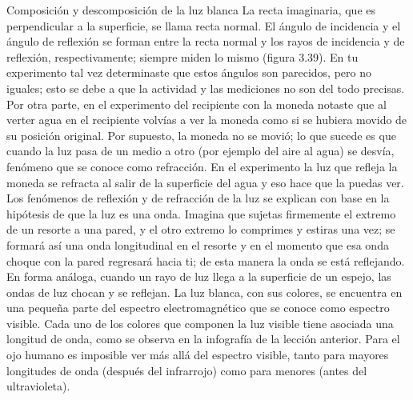 \begin{sectionbox}{Composición y descomposición de la luz blanca}
           La recta imaginaria, que es perpendicular a la superficie, se llama recta normal. El
           ángulo de incidencia y el ángulo de reflexión se forman entre la recta normal y los rayos de incidencia y de reflexión, respectivamente; siempre miden lo mismo (figura 3.39).
           En tu experimento tal vez determinaste que estos ángulos son parecidos, pero no iguales; esto se debe a que la actividad y las mediciones no son del todo precisas.
           Por otra parte, en el experimento del recipiente con la moneda notaste que al verter
           agua en el recipiente volvías a ver la moneda como si se hubiera movido de su posición
           original. Por supuesto, la moneda no se movió; lo que sucede es que cuando la luz pasa
           de un medio a otro (por ejemplo del aire al agua) se desvía, fenómeno que se conoce como
           refracción. En el experimento la luz que refleja la moneda se refracta
           al salir de la superficie del agua y eso hace que la puedas ver.
           Los fenómenos de reflexión y de refracción de la luz se explican
           con base en la hipótesis de que la luz es una onda. Imagina que
           sujetas firmemente el extremo de un resorte a una pared, y el otro
           extremo lo comprimes y estiras una vez; se formará así una onda
           longitudinal en el resorte y en el momento que esa onda choque
           con la pared regresará hacia ti; de esta manera la onda se está
           reflejando. En forma análoga, cuando un rayo de luz llega a la superficie de un espejo, las ondas de luz chocan y se reflejan.
           La luz blanca, con sus colores, se encuentra en una pequeña parte
           del espectro electromagnético que se conoce como espectro visible.
           Cada uno de los colores que componen la luz visible tiene asociada
           una longitud de onda, como se observa en la infografía de la lección
           anterior. Para el ojo humano es imposible ver más allá del espectro
           visible, tanto para mayores longitudes de onda (después del infrarrojo) como para menores (antes del ultravioleta).

       \end{sectionbox}